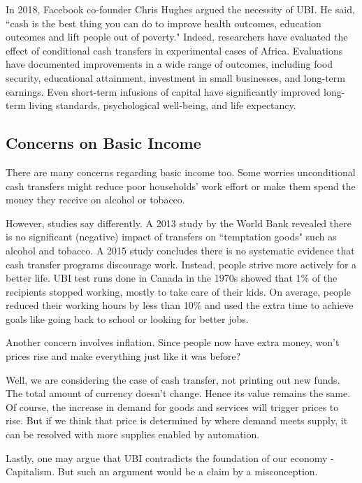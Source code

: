 \documentclass[10pt,a4paper]{article}
\begin{document}
	In 2018, Facebook co-founder Chris Hughes argued the necessity of UBI. He said, ``cash is the best thing you can do to improve health outcomes, education outcomes and lift people out of poverty."\cite{facebook} Indeed, researchers have evaluated the effect of conditional cash transfers in experimental cases of Africa. Evaluations have documented improvements in a wide range of outcomes, including food security, educational attainment, investment in small businesses, and long-term earnings. Even short-term infusions of capital have significantly improved long-term living standards, psychological well-being, and life expectancy.\cite{kenya}
	
	\subsection*{Concerns on Basic Income}
	
	There are many concerns regarding basic income too. Some worries unconditional cash transfers might reduce poor households' work effort or make them spend the money they receive on alcohol or tobacco.
	
	However, studies say differently. A 2013 study by the World Bank revealed there is no significant (negative) impact of transfers on ``temptation goods" such as alcohol and tobacco.\cite{alcohol} A 2015 study concludes there is no systematic evidence that cash transfer programs discourage work.\cite{lazy} Instead, people strive more actively for a better life. UBI test runs done in Canada in the 1970s showed that 1\% of the recipients stopped working, mostly to take care of their kids. On average, people reduced their working hours by less than 10\% and used the extra time to achieve goals like going back to school or looking for better jobs.\cite{canada}
	
	Another concern involves inflation. Since people now have extra money, won't prices rise and make everything just like it was before?
	
	Well, we are considering the case of cash transfer, not printing out new funds. The total amount of currency doesn't change. Hence its value remains the same. Of course, the increase in demand for goods and services will trigger prices to rise. But if we think that price is determined by where demand meets supply, it can be resolved with more supplies enabled by automation.
	
	Lastly, one may argue that UBI contradicts the foundation of our economy - Capitalism. But such an argument would be a claim by a misconception.
	
\end{document}
